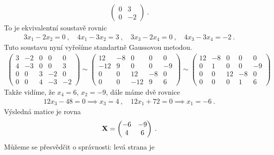 \begin{example}
\begin{align}
\begin{pmatrix}
            0 & 3 \\ 0 & -2
        \end{pmatrix} \:.
    \end{align}
    To je ekvivalentní soustavě rovnic
        \begin{align}
            3 x_1 - 2 x_2 = 0 \:,\quad
            4 x_1 - 3 x_2 = 3 \:,\quad
            3 x_3 - 2 x_4 = 0 \:,\quad
            4 x_3 - 3 x_4 = -2 \:.
        \end{align}
    Tuto soustavu nyní vyřešíme standartně Gaussovou metodou.
    \begin{align}
        \left(\begin{array}{cccc|c}
            3 & -2 & 0 & 0 & 0 \\
            4 & -3 & 0 & 0 & 3 \\
            0 & 0 & 3 & -2 & 0 \\
            0 & 0 & 4 & -3 & -2 
        \end{array}\right)
        \sim
        \left(\begin{array}{cccc|c}
            12 & -8 & 0 & 0 & 0 \\
            -12 & 9 & 0 & 0 & -9 \\
            0 & 0 & 12 & -8 & 0 \\
            0 & 0 & -12 & 9 & 6 
        \end{array}\right)
        \sim
        \left(\begin{array}{cccc|c}
            12 & -8 & 0 & 0 & 0 \\
            0 & 1 & 0 & 0 & -9 \\
            0 & 0 & 12 & -8 & 0 \\
            0 & 0 & 0 & 1 & 6 
        \end{array}\right)
    \end{align}
    Takže vidíme, že $x_4 = 6$, $x_2 = -9$, dále máme dvě rovnice
    \begin{align}
        12 x_3 - 48 = 0 \implies x_3 = 4 \:, \quad 12 x_1 + 72 = 0 \implies x_1 = -6 \:.
    \end{align}
    Výsledná matice je rovna
    \begin{align}
        \mathbf{X} = \begin{pmatrix}
            -6 & -9 \\ 4 & 6
        \end{pmatrix} \:.
    \end{align}
    Můžeme se přesvědčit o správnosti: levá strana je
    \begin{align}

\end{align}
\end{example}
